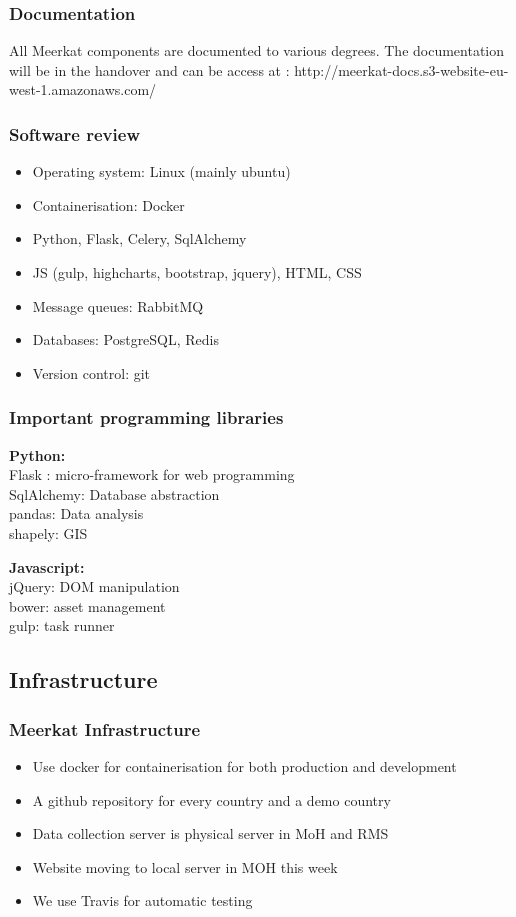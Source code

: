 \documentclass{beamer}
\begin{document}
\begin{frame}
  \frametitle{Documentation}

  All Meerkat components are documented to various degrees. The documentation will be in the handover and can be access at : http://meerkat-docs.s3-website-eu-west-1.amazonaws.com/
  
\end{frame}

\begin{frame}
  \frametitle{Software review}
  \begin{itemize}
  \item Operating system: Linux (mainly ubuntu)
  \item Containerisation: Docker
  \item Python, Flask, Celery, SqlAlchemy
  \item JS (gulp, highcharts, bootstrap, jquery), HTML, CSS
  \item Message queues: RabbitMQ
  \item Databases: PostgreSQL, Redis
  \item Version control: git 
  \end{itemize}
\end{frame}
\begin{frame}
  \frametitle{Important programming libraries}
  {\bf Python:} \\
  Flask : micro-framework for web programming \\
  SqlAlchemy: Database abstraction \\
  pandas: Data analysis \\
  shapely: GIS \\

  \vspace{10pt}

  {\bf Javascript:} \\
  jQuery: DOM manipulation \\
  bower: asset management \\
  gulp: task runner \\
  
\end{frame}

\subsection{Infrastructure}
\begin{frame}
  \frametitle{Meerkat Infrastructure}
  \begin{itemize}
  \item Use docker for containerisation for both production and development
  \item A github repository for every country and a demo country
  \item Data collection server is physical server in MoH and RMS
  \item Website moving to local server in MOH this week
  \item We use Travis for automatic testing
  \end{itemize}
\end{frame}
\end{document}
